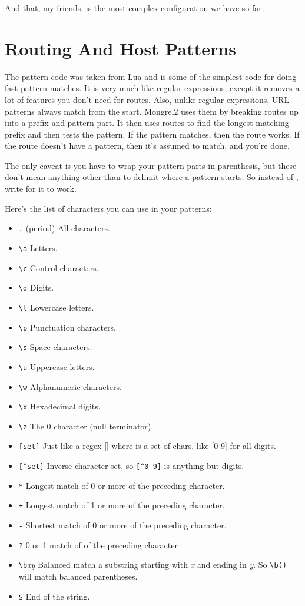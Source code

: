 And that, my friends, is the most complex configuration we have so far.


\section{Routing And Host Patterns}

The pattern code was taken from \href{http://www.lua.org/}{Lua} and is some of
the simplest code for doing fast pattern matches.  It is very much like regular
expressions, except it removes a lot of features you don't need for routes.
Also, unlike regular expressions, URL patterns always match from the start.
Mongrel2 uses them by breaking routes up into a prefix and pattern part.  It
then uses routes to find the longest matching prefix and then tests the
pattern.  If the pattern matches, then the route works.  If the route doesn't
have a pattern, then it's assumed to match, and you're done.

The only caveat is you have to wrap your pattern parts in parenthesis, but these don't mean anything
other than to delimit where a pattern starts.  So instead of , write 
for it to work.

Here's the list of characters you can use in your patterns:

\begin{itemize}
\item \verb|.| (period) All characters.
\item \verb|\a| Letters.
\item \verb|\c| Control characters.
\item \verb|\d| Digits.
\item \verb|\l| Lowercase letters.
\item \verb|\p| Punctuation characters.
\item \verb|\s| Space characters.
\item \verb|\u| Uppercase letters.
\item \verb|\w| Alphanumeric characters.
\item \verb|\x| Hexadecimal digits.
\item \verb|\z| The 0 character (null terminator).
\item \verb|[set]| Just like a regex [] where is a set of chars, like [0-9] for all digits.
\item \verb|[^set]| Inverse character set, so \verb|[^0-9]| is anything but digits.
\item \verb|*| Longest match of 0 or more of the preceding character.
\item \verb|+| Longest match of 1 or more of the preceding character.
\item \verb|-| Shortest match of 0 or more of the preceding character.
\item \verb|?| 0 or 1 match of of the preceding character
\item \verb|\b|\emph{xy} Balanced match a substring starting with \emph{x}
  and ending in \emph{y}.  So \verb|\b()| will match balanced parentheses.
\item \verb|$| End of the string.
\end{itemize}

